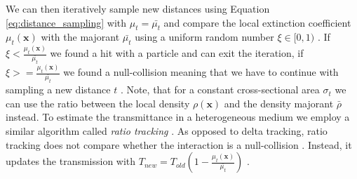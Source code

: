 We can then iteratively sample new distances using Equation \ref{eq:distance_sampling} with $\mu_t=\bar{\mu_t}$ and compare the local extinction coefficient $\mu_t(\boldsymbol{x})$ with the majorant $\bar{\mu_t}$ using a uniform random number $\xi\in[0,1)$ \cite{spectral_and_decomposition_tracking}.
If $\xi<\frac{\mu_t(\boldsymbol{x})}{\bar{\mu_t}}$ we found a hit with a particle and can exit the iteration, if $\xi>=\frac{\mu_t(\boldsymbol{x})}{\bar{\mu_t}}$ we found a null-collision meaning that we have to continue with sampling a new distance $t$ \cite{spectral_and_decomposition_tracking}.
Note, that for a constant cross-sectional area $\sigma_t$ we can use the ratio between the local density $\rho(\boldsymbol{x})$ and the density majorant $\bar{\rho}$ instead.
To estimate the transmittance in a heterogeneous medium we employ a similar algorithm called \textit{ratio tracking} \cite{novak_ratio_tracking}.
As opposed to delta tracking, ratio tracking does not compare whether the interaction is a null-collision \cite{novak_ratio_tracking}.
Instead, it updates the transmission with $T_{new} = T_{old}(1 - \frac{\mu_t(\boldsymbol{x})}{\bar{\mu_t}})$ \cite{novak_ratio_tracking}.

